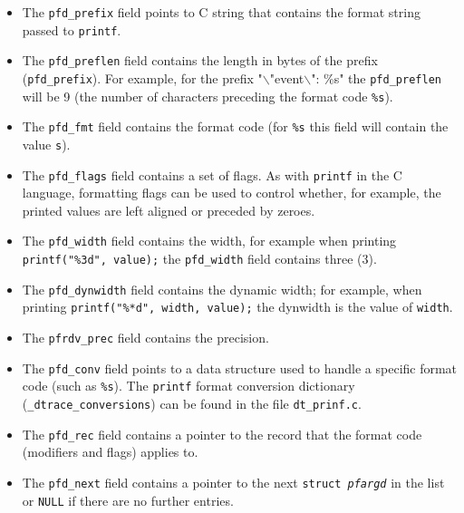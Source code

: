\begin{itemize}

	\item The \texttt{pfd\_prefix} field points to C string that contains
the format string passed to \texttt{printf{}}.

	\item The \texttt{pfd\_preflen} field contains the length in bytes of the
prefix (\texttt{pfd\_prefix}). For example, for the prefix
"$\backslash$"event$\backslash$": \%s" the \texttt{pfd\_preflen} will be 9 (the
number of characters preceding the format code \texttt{\%s}). 

	\item The \texttt{pfd\_fmt} field contains the format code (for
\texttt{\%s} this field will contain the value \texttt{s}).

	\item The \texttt{pfd\_flags} field contains a set of flags. As with
\texttt{printf} in the C language, formatting flags can be used to control
whether, for example, the printed values are left aligned or preceded by
zeroes.

	\item The \texttt{pfd\_width} field contains the width, for example
when printing \texttt{printf("\%3d", value);} the \texttt{pfd\_width} field
contains three (3). 

	\item The \texttt{pfd\_dynwidth} field contains the dynamic width;
for example, when printing \texttt{printf("\%*d", width, value);} the dynwidth
is the value of \texttt{width}. 

	\item The \texttt{pfrdv\_prec} field contains the precision.

	\item The \texttt{pfd\_conv} field points to a data structure used to
handle a specific format code (such as \texttt{\%s}). The \texttt{printf} format
conversion dictionary (\texttt{\_dtrace\_conversions}) can be found in the
file \texttt{dt\_prinf.c}.

	\item The \texttt{pfd\_rec} field contains a pointer to the record that
the format code (modifiers and flags) applies to.

	\item The \texttt{pfd\_next} field contains a pointer to the next
\texttt{struct~\textit{pfargd}} in the list or \texttt{NULL} if there are no
further entries.

\end{itemize}

